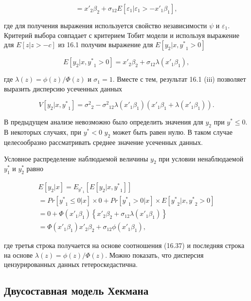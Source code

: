 \[
={x'}_2\beta_2+\sigma_{12}E[\varepsilon_1|\varepsilon_1>-{x'}_1\beta_1],
\]

где для получения выражения используется свойство независимости $\psi$ и $\varepsilon_1$. Критерий выбора совпадает с критерием Тобит модели и используя выражение для $E[z|z>-c]$ из 16.1 получим выражение для $E[y_2|x,{y^{*}}_1>0]$

\begin{equation}
E[y_2|x,{y^{*}}_1>0]={x'}_2\beta_2+\sigma_{12}\lambda({x'}_1\beta_1),
\end{equation}

где $\lambda(z)=\phi(z)/\Phi(z)$ и ${\sigma}_1=1$.  Вместе с тем, результат 16.1 (iii) позволяет выразить дисперсию усеченных данных

\begin{equation}
V[y_2|x,{y^{*}}_1]={\sigma^2}_2-{\sigma^2}_{12}\lambda({x'}_1\beta_1)({x'}_1\beta_1+\lambda({x'}_1\beta_1)).
\end{equation}

В предыдущем анализе невозможно было определить значения для $y_2$ при ${y^{*}}{\leq}0$. В некоторых случаях, при ${y^{*}}<0$ $y_2$ может быть равен нулю. В таком случае целесообразно рассматривать среднее значение усеченных данных. 


Условное распределение наблюдаемой величины $y_2$ при условии ненаблюдаемой $y^{*}_1$ и $y^{*}_2$ равно

\begin{equation}
\begin{split}
E[y_2|x]=E_{{y^{*}}_1}[E[y_2|x,{y^{*}}_1]] \\
=Pr[{y^{*}}_1{\leq}0|x]{\times}0+Pr[{y^{*}}_1>0|x]{\times}E[{y^{*}}_2|x,{y^{*}}_2>0] \\
=0+\Phi({x'}_1\beta_1)\left\lbrace{x'}_2\beta_2+\sigma_{12}\lambda\left({x'}_1\beta_1\right)\right\rbrace \\
=\Phi({x'}_1\beta_1){x'}_2\beta_2+\sigma_{12}\phi({x'}_1\beta_1),
\end{split}
\end{equation}

где третья строка получается на основе соотношения (16.37) и последняя строка на основе $\lambda(z)=\phi(z)/{\Phi}(z)$. Можно показать, что дисперсия цензурированных данных гетероскедастична.


\subsection{Двусоставная модель Хекмана}

